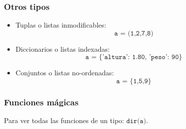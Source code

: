 \documentclass[14pt,aspectratio=169,xcolor=dvipsnames]{beamer}
\begin{document}
\begin{frame}\frametitle{Otros tipos}
    \begin{itemize}
        \item Tuplas o listas inmodificables: 
            $$  \texttt{a = (1,2,7,8)} $$
        \item Diccionarios o listas indexadas:
            $$ \texttt{a = \{'altura': 1.80, 'peso': 90\}} $$
        \item Conjuntos o listas no-ordenadas: 
            $$ \texttt{a = \{1,5,9\}} $$
    \end{itemize}

\pause{}
\end{frame}
\begin{frame}\frametitle{Funciones mágicas}
Para ver todas las funciones de un tipo: $\texttt{dir(a)}$.

\vspace{2cm}
\end{frame}
\begin{frame}
    \maketitle
\end{frame}
\end{document}
